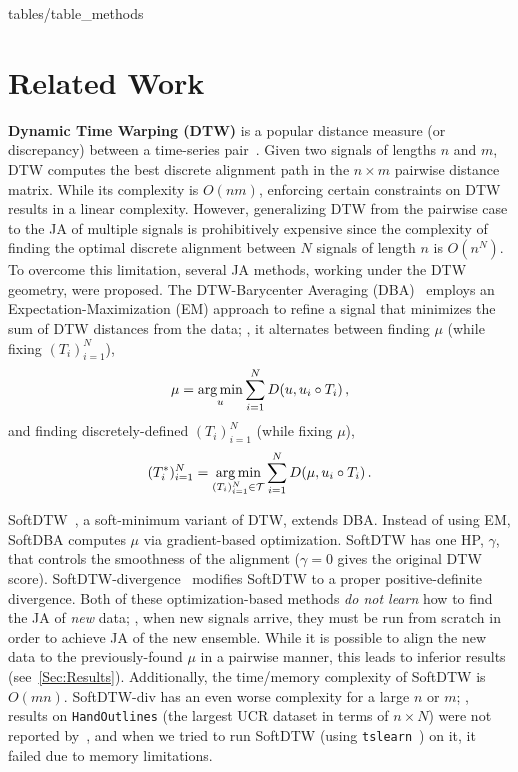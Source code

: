{tables/table_methods}

\section{Related Work}\label{Sec:previous}
\textbf{Dynamic Time Warping (DTW)} is a popular distance measure (or discrepancy) between a time-series pair~\cite{Sakoe:ICA:1971:DTW1,Sakoe:ASSP:1971:DTW2}. Given two signals of lengths $n$ and $m$, DTW computes
the best discrete alignment path in the $n\times m$ pairwise distance matrix. While its complexity is $O(nm)$, enforcing certain constraints on DTW results in a linear complexity. 
However, generalizing DTW from the pairwise case to the JA of multiple signals is prohibitively expensive
since the complexity of finding the optimal discrete alignment between $N$ signals of length $n$ is $O(n^N)$.
To overcome this limitation, several JA methods, working under the DTW geometry, were proposed.
The DTW-Barycenter Averaging (DBA)~\cite{Petitjean:2011:global,Petitjean:2014:dynamic} employs an Expectation-Maximization (EM) approach 
to refine a signal that minimizes the sum of DTW distances from the data; \ie, 
it alternates between finding  $\mu$ (while fixing $(T_i)_{i=1}^N$),
\begin{align}\label{eq:ts:average}
    \mu = \operatorname*{arg\,min}_{u}\sum\limits_{i=1}^N D(u, u_i\circ T_i) \, ,
\end{align}
and finding  discretely-defined $(T_i)_{i=1}^N$ (while fixing $\mu$),
\begin{align}\label{eq:loss:and:prior}
    (T_i^*)_{i=1}^N = \operatorname*{arg\,min}_{(T_i)_{i=1}^N\in\mathcal{T}} \sum\limits_{i=1}^N 
     D(\mu, u_i\circ T_i) \, .
\end{align}

%
  SoftDTW~\cite{cuturi:2017:soft}, a soft-minimum variant of DTW, extends DBA. 
  Instead of using EM, SoftDBA computes $\mu$ via gradient-based optimization. SoftDTW has one HP, $\gamma$, that controls the smoothness of the alignment ($\gamma=0$
  gives the original DTW score). 
  SoftDTW-divergence~\cite{Blondel:2021:differentiable} modifies SoftDTW to a proper positive-definite divergence. Both of these optimization-based methods \emph{do not learn} how to find the JA of \emph{new} data; \ie, 
  when new signals arrive, they must be run from scratch in order to achieve JA of the new ensemble. While it is possible to align the new data to the previously-found $\mu$ in a pairwise manner, this leads to inferior results (see~\autoref{Sec:Results}). 
  Additionally, the time/memory complexity of SoftDTW is $O(mn)$. SoftDTW-div
  has an even worse complexity for a large $n$ or $m$; \eg, results on \texttt{HandOutlines} (the largest UCR dataset in terms of $n\times N$) %
  were not reported by~\cite{Blondel:2021:differentiable}, and when we tried to run SoftDTW (using \texttt{tslearn}~\cite{tavenard:2017:tslearn}) on it, 
  it failed due to memory limitations. 

